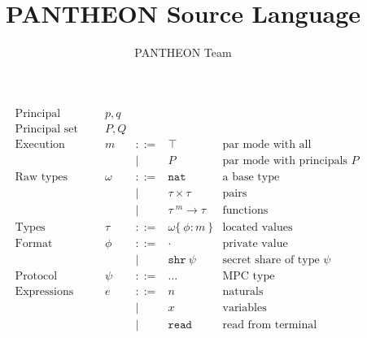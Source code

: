 \documentclass[10pt]{article}
\title{PANTHEON Source Language}
\author{PANTHEON Team}
\newcommand{\kw}[1]{\ensuremath{\mathtt{#1}}}
\newcommand{\tnat}{\ensuremath{\mathtt{nat}}}
\newcommand{\tlist}[1]{\ensuremath{\mathtt{list}~{#1}}}
\newcommand{\tfun}[3]{\ensuremath{{#1} ~^{#3}\!\rightarrow {#2}}}
\newcommand{\tprod}[2]{\ensuremath{{#1} \times {#2}}}
\newcommand{\tsum}[2]{\ensuremath{{#1} + {#2}}}
\newcommand{\ssec}{\ensuremath{\mathtt{\cdot}}}
\newcommand{\isec}{\ensuremath{\mathtt{pmap}}}
\newcommand{\sshare}[1]{\ensuremath{\mathtt{shr}~{#1}}}
\newcommand{\sectyp}[3]{\ensuremath{{#1} \{~{#2}:{#3}~\}}}
\newcommand{\econcat}[2]{\ensuremath{{#1} +\!\!+~ {#2}}}
\newcommand{\eaccval}[2]{\ensuremath{{#1}.{#2}}}
\newcommand{\eread}{\ensuremath{\kw{read}}}
\begin{document}
\maketitle

\begin{figure}[h]
  \centering
  \[\begin{array}{rlcll}
      \text{Principal} & p, q \\
      \text{Principal set} & P, Q \\
    \text{Execution modes} & m  & ::=  & \top & \text{par mode with all principals}\\
                 && \mid & P & \text{par mode with principals $P$} \\      
      \text{Raw types} & \omega  & ::=  & \tnat & \text{a base type} \\      
                       && \mid & \tprod{\tau}{\tau} & \text{pairs} \\
                       && \mid & \tfun{\tau}{\tau}{m} & \text{functions} \\
      \text{Types} & \tau & ::= &
                                 \sectyp\omega\phi{m} & \text{located values} \\
      \text{Format} & \phi & ::= & \ssec & \text{private value}  \\
                       && \mid & \sshare{\psi} & \text{secret share of type $\psi$} \\
      \text{Protocol} & \psi & ::= & ... & \text{MPC type} \\
      \text{Expressions} & e & ::= & n & \text{naturals} \\
                       && \mid & x & \text{variables} \\
                       && \mid & \eread & \text{read from terminal}\\

\end{array}\]
\end{figure}
\end{document}
